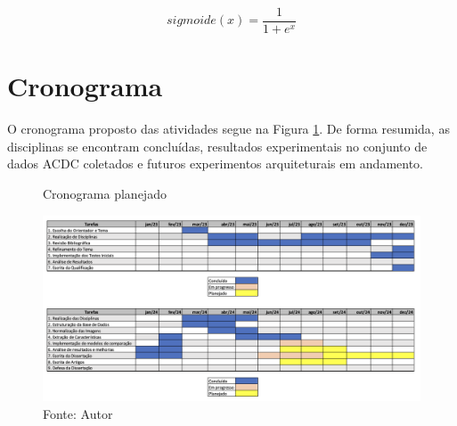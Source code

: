 \begin{equation}
\textit{sigmoide}(x) = \frac{1}{1 + e^x}
\label{eq:sigmoide}
\end{equation}

\section{Cronograma}
\label{sec:cronograma}

O cronograma proposto das atividades segue na Figura \ref{fig:fig014}. De forma resumida, as disciplinas se encontram concluídas, resultados experimentais no conjunto de dados \gls{ACDC} coletados e futuros experimentos arquiteturais em andamento.

\begin{figure}[htbp]
    \centering
    \caption{Cronograma planejado}
    \includegraphics[width=1\textwidth]{figures/fig014.png}
    \caption*{Fonte: Autor}
    \label{fig:fig014}
\end{figure}
